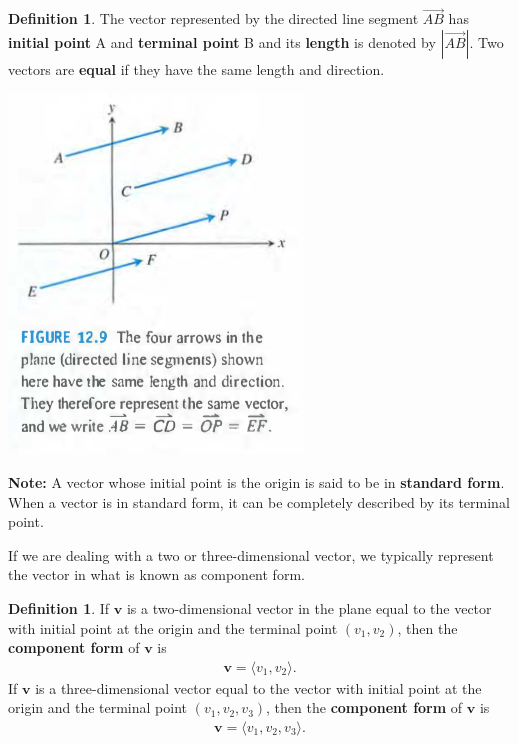 \documentclass[12pt, letter]{article}
\theoremstyle{plain}
\numberwithin{theorem}{section}
\theoremstyle{definition}
\newtheorem{definition}[theorem]{Definition}
\begin{document}
\bigskip

\hrulefill

\bigskip

\begin{definition}
The vector represented by the directed line segment $\vec{AB}$ has \textbf{initial point} A and \textbf{terminal point} B and its \textbf{length} is denoted by $|\vec{AB}|$. Two vectors are \textbf{equal} if they have the same length and direction.
\end{definition}

\bigskip

\begin{center}
\includegraphics[scale=0.7]{m1_f3}
\end{center}

\bigskip

\textbf{Note:} A vector whose initial point is the origin is said to be in \textbf{standard form}. When a vector is in standard form, it can be completely described by its terminal point.

\bigskip

\hrulefill

\bigskip

If we are dealing with a two or three-dimensional vector, we typically represent the vector in what is known as component form.

\bigskip

\begin{definition}
If $\bm{v}$ is a two-dimensional vector in the plane equal to the vector with initial point at the origin and the terminal point $(v_1,v_2)$, then the \textbf{component form} of $\bm{v}$ is
\begin{align*}
\bm{v} = \langle v_1, v_2 \rangle.
\end{align*}
If $\bm{v}$ is a three-dimensional vector equal to the vector with initial point at the origin and the terminal point $(v_1,v_2,v_3)$, then the \textbf{component form} of $\bm{v}$ is
\begin{align*}
\bm{v} = \langle v_1, v_2, v_3 \rangle.
\end{align*}
\end{definition}
\end{document}
